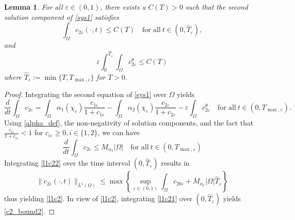 \documentclass[a4paper,10pt]{article}
\newtheorem{Lemma}[Theorem]{Lemma}
\theoremstyle{definition}
\begin{document}
\begin{Lemma}
\label{lemmal2c2}
For all $\varepsilon \in (0, 1)$, there exists a $C(T) > 0$ such that the second solution component of \eqref{sys1} satisfies
  \begin{equation}
    \label{l1c2}
    \int_\Omega c_{2\varepsilon}(\cdot, t) \leq C(T) \quad \text{for all}~ t \in (0, \widehat{T}_\varepsilon),
  \end{equation}
  and
   \begin{equation}
   \label{c2_bound2}
    \varepsilon \int_0^{\widehat{T}_\varepsilon} \int_\Omega c_{2\varepsilon}^\theta \leq C(T)
  \end{equation}
  where $\widehat{T}_\varepsilon := \min\{T, T_{\max, \varepsilon}\}$ for $T > 0$.
\end{Lemma}

\begin{proof}
Integrating the second equation of \eqref{sys1} over $\Omega$ yields
  \begin{equation}
  \label{l1c21}
    \dfrac{d}{dt}\int_\Omega c_{2\varepsilon} = \int_\Omega \alpha_1(\chi_\varepsilon) \dfrac{c_{1\varepsilon}}{1 + c_{1\varepsilon}} - \int_\Omega \alpha_2(\chi_\varepsilon) \dfrac{c_{2\varepsilon}}{1 + c_{2\varepsilon}} - \varepsilon \int_\Omega c_{2\varepsilon}^\theta \quad \text{for all}~ t \in (0, T_{\max, \varepsilon}).
  \end{equation}
  Using \eqref{alpha_def}, the non-negativity of solution components, and the fact that $\frac{c_{i\varepsilon}}{1 + c_{i\varepsilon}} < 1$ for $c_{i\varepsilon} \geq 0, i \in \{1, 2\}$, we can have
  \begin{equation}
  \label{l1c22}
    \dfrac{d}{dt}\int_\Omega c_{2\varepsilon} \leq M_{\alpha_1}|\Omega| \quad \text{for all}~ t \in (0, T_{\max, \varepsilon})
  \end{equation}
    Integrating \eqref{l1c22} over the time interval $(0, \widehat{T}_\varepsilon)$  results in
   \begin{equation*}
     \|c_{2\varepsilon}(\cdot, t)\|_{L^1(\Omega)} \leq \max \left\{\sup_{\varepsilon \in (0, 1)} \int_\Omega c_{20\varepsilon} + M_{\alpha_1}|\Omega|\widehat{T}_\varepsilon\right\}
   \end{equation*}
   thus yielding \eqref{l1c2}. In view of \eqref{l1c2}, integrating \eqref{l1c21} over  $(0, \widehat{T}_\varepsilon)$ yields \eqref{c2_bound2}.
\end{proof}

\end{document}
